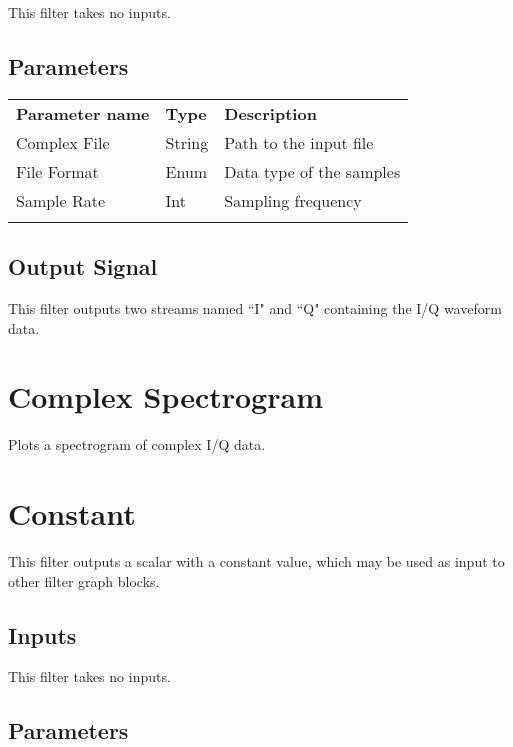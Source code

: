 This filter takes no inputs.

\subsection{Parameters}

\begin{tabularx}{16cm}{llX}
\thickhline
\textbf{Parameter name} & \textbf{Type} & \textbf{Description} \\
\thickhline
Complex File & String & Path to the input file\\
\thinhline
File Format & Enum & Data type of the samples\\
\thinhline
Sample Rate & Int & Sampling frequency\\
\thickhline
\end{tabularx}

\subsection{Output Signal}

This filter outputs two streams named ``I" and ``Q" containing the I/Q waveform data.

\pagebreak
\section{Complex Spectrogram}

Plots a spectrogram of complex I/Q data.

\pagebreak
\section{Constant}
\label{filter:constant}

This filter outputs a scalar with a constant value, which may be used as input to other filter graph blocks.

\subsection{Inputs}

This filter takes no inputs.

\subsection{Parameters}

